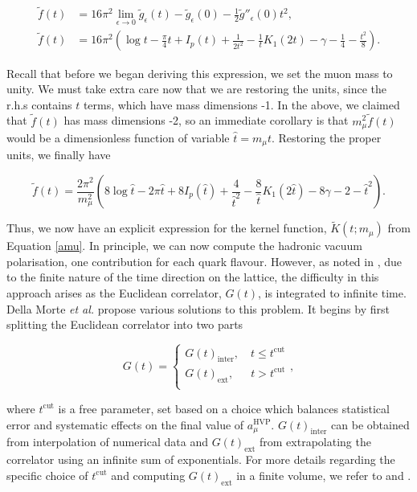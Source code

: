 \documentclass{article}
\numberwithin{equation}{section} %
\begin{document}
\begin{equation}
\begin{split}
\tilde{f}(t)&= 16\pi^2 \lim_{\epsilon\rightarrow 0}\tilde{g}_\epsilon(t) - \tilde{g}_\epsilon(0) - \frac{1}{2} \tilde{g}''_\epsilon(0)t^2,\\
\tilde{f}(t)&= 16\pi^2 (\log t - \frac{\pi}{4}t + I_p(t) + \frac{1}{2t^2} - \frac{1}{t}K_1(2t) - \gamma - \frac{1}{4} - \frac{t^2}{8}).
\end{split}
\end{equation}

Recall that before we began deriving this expression, we set the muon mass to unity. We must take extra care now that we are restoring the units, since the r.h.s contains $t$ terms, which have mass dimensions -1. In the above, we claimed that $\tilde{f}(t)$ has mass dimensions -2, so an immediate corollary is that $m_\mu^2\tilde{f}(t)$ would be a dimensionless function of variable $\hat{t}=m_\mu t$. Restoring the proper units, we finally have

\begin{equation}
\tilde{f}(t)= \frac{2\pi^2}{m_\mu^2}(8\log \hat{t} - 2\pi \hat{t} + 8I_p(\hat{t}) + \frac{4}{\hat{t}^2} - \frac{8}{\hat{t}}K_1(2\hat{t}) - 8\gamma - 2 - \hat{t}^2).
\label{ftilde final}
\end{equation}

Thus, we now have an explicit expression for the kernel function, $\tilde{K}(t;m_\mu)$ from Equation \ref{amu}. In principle, we can now compute the hadronic vacuum polarisation, one contribution for each quark flavour. However, as noted in \cite{dellamorte}, due to the finite nature of the time direction on the lattice, the difficulty in this approach arises as the Euclidean correlator, $G(t)$, is integrated to infinite time. Della Morte \textit{et al.} propose various solutions to this problem. It begins by first splitting the Euclidean correlator into two parts

\begin{equation}
G(t)=
\begin{cases}
G(t)_{\mathrm{inter}}, \quad t \leq t^{\mathrm{cut}} \\
G(t)_{\mathrm{ext}}, \,\,\,\quad t > t^{\mathrm{cut}} \\
\end{cases},
\end{equation}

\noindent where $t^{\mathrm{cut}}$ is a free parameter, set based on a choice which balances statistical error and systematic effects on the final value of $a_\mu^{\mathrm{HVP}}$. $G(t)_{\mathrm{inter}}$ can be obtained from interpolation of numerical data and $G(t)_{\mathrm{ext}}$ from extrapolating the correlator using an infinite sum of exponentials. For more details regarding the specific choice of $t^{\mathrm{cut}}$ and computing $G(t)_{\mathrm{ext}}$ in a finite volume, we refer to \cite{dellamorte} and \cite{vector}.
\end{document}
